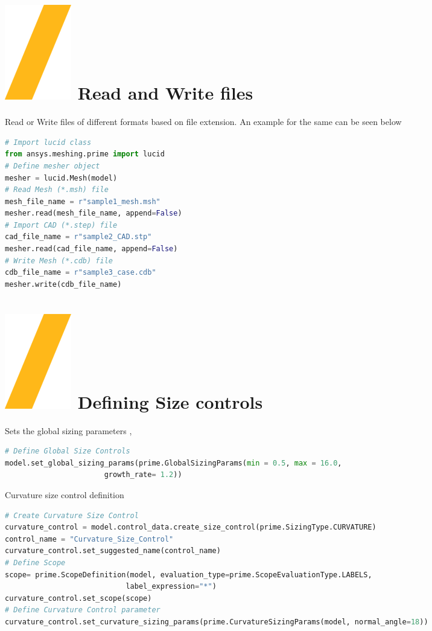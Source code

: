 \documentclass[9pt,landscape]{article}
\begin{document}
\begin{multicols}{3}
\section{\includegraphics[height=\fontcharht\font`\S]{slash.png} Read and Write files }
Read or Write files of different formats based on file extension.
An example for the same can be seen below\\
\begin{lstlisting}[language=Python]
# Import lucid class
from ansys.meshing.prime import lucid
# Define mesher object
mesher = lucid.Mesh(model)
# Read Mesh (*.msh) file
mesh_file_name = r"sample1_mesh.msh"
mesher.read(mesh_file_name, append=False)
# Import CAD (*.step) file
cad_file_name = r"sample2_CAD.stp"
mesher.read(cad_file_name, append=False)
# Write Mesh (*.cdb) file
cdb_file_name = r"sample3_case.cdb"
mesher.write(cdb_file_name)
\end{lstlisting}

\section{\includegraphics[height=\fontcharht\font`\S]{slash.png} Defining Size controls }
Sets the global sizing parameters , 

\begin{lstlisting}[language=Python]
# Define Global Size Controls
model.set_global_sizing_params(prime.GlobalSizingParams(min = 0.5, max = 16.0,
                       growth_rate= 1.2))
\end{lstlisting}

Curvature size control definition
\begin{lstlisting}[language=Python]
# Create Curvature Size Control
curvature_control = model.control_data.create_size_control(prime.SizingType.CURVATURE)
control_name = "Curvature_Size_Control"
curvature_control.set_suggested_name(control_name)
# Define Scope 
scope= prime.ScopeDefinition(model, evaluation_type=prime.ScopeEvaluationType.LABELS,
                            label_expression="*")
curvature_control.set_scope(scope)
# Define Curvature Control parameter
curvature_control.set_curvature_sizing_params(prime.CurvatureSizingParams(model, normal_angle=18))
\end{lstlisting}

\end{multicols}
\end{document}

